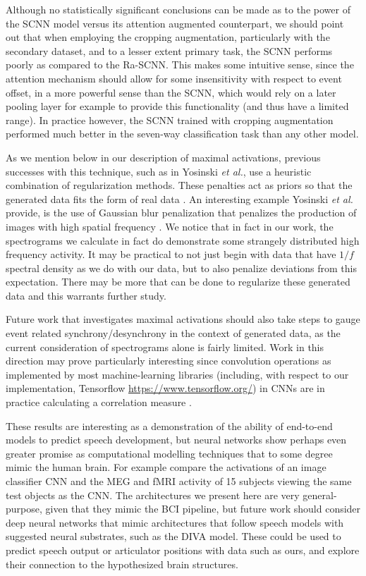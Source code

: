 \documentclass[fleqn,10pt]{wlscirep}
\begin{document}
Although no statistically significant conclusions can be made as to the power of the SCNN model versus its attention augmented counterpart, we should point out that when employing the cropping augmentation, particularly with the secondary dataset, and to a lesser extent primary task, the SCNN performs poorly as compared to the Ra-SCNN. This makes some intuitive sense, since the attention mechanism should allow for some insensitivity with respect to event offset, in a more powerful sense than the SCNN, which would rely on a later pooling layer for example to provide this functionality (and thus have a limited range). In practice however, the SCNN trained with cropping augmentation performed much better in the seven-way classification task than any other model.

As we mention below in our description of maximal activations, previous successes with this technique, such as in Yosinski {\em et al.}, use a heuristic combination of regularization methods. These penalties act as priors so that the generated data fits the form of real data \cite{Yosinski2015}. An interesting example Yosinski {\em et al.} provide, is the use of Gaussian blur penalization that penalizes the production of images with high spatial frequency \cite{Yosinski2015}. We notice that in fact in our work, the spectrograms we calculate in fact do demonstrate some strangely distributed high frequency activity. It may be practical to not just begin with data that have $1/f$ spectral density as we do with our data, but to also penalize deviations from this expectation. There may be more that can be done to regularize these generated data and this warrants further study.

Future work that investigates maximal activations should also take steps to gauge event related synchrony/desynchrony in the context of generated data, as the current consideration of spectrograms alone is fairly limited. Work in this direction may prove particularly interesting since convolution operations as implemented by most machine-learning libraries (including, with respect to our implementation, Tensorflow \url{https://www.tensorflow.org/}) in CNNs are in practice calculating a correlation measure \cite{GravesRNNBook}.

These results are interesting as a demonstration of the ability of end-to-end models to predict speech development, but neural networks show perhaps even greater promise as computational modelling techniques that to some degree mimic the human brain. For example \cite{cichy2016} compare the activations of an image classifier CNN and the MEG and fMRI activity of 15 subjects viewing the same test objects as the CNN. The architectures we present here are very general-purpose, given that they mimic the BCI pipeline, but future work should consider deep neural networks that mimic architectures that follow speech models with suggested neural substrates, such as the DIVA model\cite{Guenther2005}. These could be used to predict speech output or articulator positions with data such as ours, and explore their connection to the hypothesized brain structures.
\end{document}
